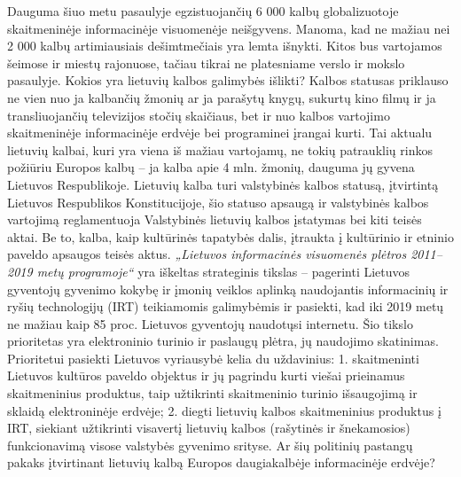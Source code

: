 \begin{multicols}{2}
Dauguma šiuo metu pasaulyje egzistuojančių 6 000 kalbų globalizuotoje skaitmeninėje informacinėje visuomenėje neišgyvens. Manoma, kad ne mažiau nei 2 000 kalbų artimiausiais dešimtmečiais yra lemta išnykti. Kitos bus vartojamos šeimose ir miestų rajonuose, tačiau tikrai ne platesniame verslo ir mokslo pasaulyje. Kokios yra lietuvių kalbos galimybės išlikti? Kalbos statusas priklauso ne vien nuo ja kalbančių žmonių ar ja parašytų knygų, sukurtų kino filmų ir ja transliuojančių televizijos stočių skaičiaus, bet ir nuo kalbos vartojimo skaitmeninėje informacinėje erdvėje bei programinei įrangai kurti. Tai aktualu lietuvių kalbai, kuri yra viena iš mažiau vartojamų, ne tokių patrauklių rinkos požiūriu Europos kalbų – ja kalba apie 4 mln. žmonių, dauguma jų gyvena Lietuvos Respublikoje. Lietuvių kalba turi valstybinės kalbos statusą, įtvirtintą Lietuvos Respublikos Konstitucijoje, šio statuso apsaugą ir valstybinės kalbos vartojimą reglamentuoja Valstybinės lietuvių kalbos įstatymas bei kiti teisės aktai. Be to, kalba, kaip kultūrinės tapatybės dalis, įtraukta į kultūrinio ir etninio paveldo apsaugos teisės aktus. \emph{„Lietuvos informacinės visuomenės plėtros 2011–2019 metų programoje“} yra iškeltas strateginis tikslas – pagerinti Lietuvos gyventojų gyvenimo kokybę ir įmonių veiklos aplinką naudojantis informacinių ir ryšių technologijų (IRT) teikiamomis galimybėmis ir pasiekti, kad iki 2019 metų ne mažiau kaip 85 proc. Lietuvos gyventojų naudotųsi internetu. Šio tikslo prioritetas yra elektroninio turinio ir paslaugų plėtra, jų naudojimo skatinimas. Prioritetui pasiekti Lietuvos vyriausybė kelia du uždavinius: 1. skaitmeninti Lietuvos kultūros paveldo objektus ir jų pagrindu kurti viešai prieinamus skaitmeninius produktus, taip užtikrinti skaitmeninio turinio išsaugojimą ir sklaidą elektroninėje erdvėje; 2. diegti lietuvių kalbos skaitmeninius produktus į IRT, siekiant užtikrinti visavertį lietuvių kalbos (rašytinės ir šnekamosios) funkcionavimą visose valstybės gyvenimo srityse. Ar šių politinių pastangų pakaks įtvirtinant lietuvių kalbą Europos daugiakalbėje informacinėje erdvėje? 


\end{multicols}
